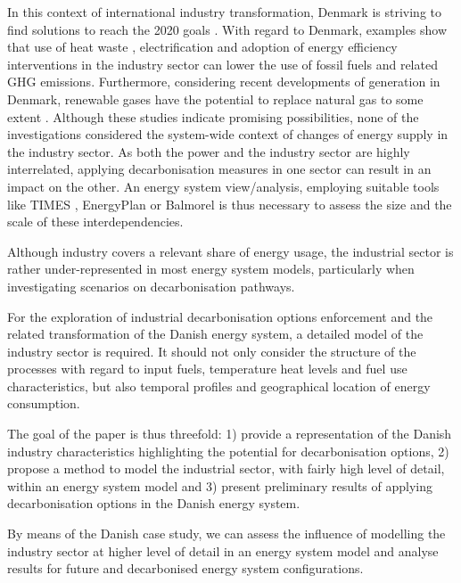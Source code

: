 \documentclass[review]{elsarticle}
\begin{document}
In this context of international industry transformation, Denmark is striving to find solutions to reach the 2020 goals \cite{EnergyCommission2017,Energikommissionen2017}. 
With regard to Denmark, examples show that use of heat waste \cite{Buhler2017a}, electrification \cite{DanishEnergyAgency2014a} and adoption of energy efficiency interventions in the industry sector \cite{DEAeff18,Buhler2016} can lower the use of fossil fuels and related GHG emissions. Furthermore, considering recent developments of generation in Denmark, renewable gases have the potential to replace natural gas to some extent \cite{Lise2017,Jensen2017}.
Although these studies indicate promising possibilities, none of the investigations considered the system-wide context of changes of energy supply in the industry sector. 
As both the power and the industry sector are highly interrelated, applying decarbonisation measures in one sector can result in an impact on the other. 
An energy system view/analysis, employing suitable tools like TIMES \cite{IEA-ETSAP}, EnergyPlan \cite{DepartmentofDevelopmentandPlanning} or Balmorel \cite{Wiese2018, balmorel} is thus necessary to assess the size and the scale of these interdependencies.

Although industry covers a relevant share of energy usage, the industrial sector is rather under-represented in most energy system models, particularly when investigating scenarios on decarbonisation pathways.

For the exploration of industrial decarbonisation options enforcement and the related transformation of the Danish energy system, a detailed model of the industry sector is required. It should not only consider the structure of the processes with regard to input fuels, temperature heat levels and fuel use characteristics, but also temporal profiles and geographical location of energy consumption.

The goal of the paper is thus threefold: 1) provide a representation of the Danish industry characteristics highlighting the potential for decarbonisation options, 2) propose a method to model the industrial sector, with fairly high level of detail, within an energy system model and 3) present preliminary results of applying decarbonisation options in the Danish energy system.

By means of the Danish case study, we can assess the influence of modelling the industry sector at higher level of detail in an energy system model and analyse results for future and decarbonised energy system configurations. 
\end{document}
